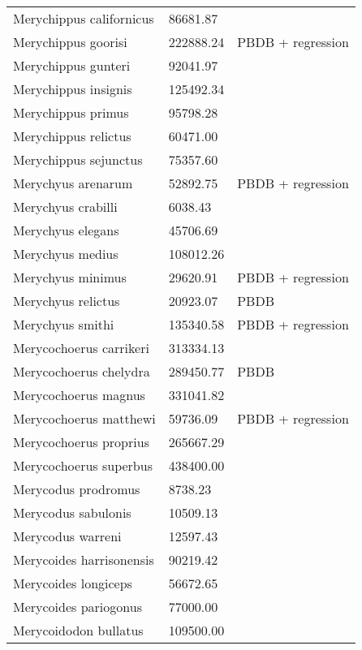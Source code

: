 \documentclass{article}
\begin{document}
\begin{center}
\begin{longtable}{p{} p{} p{} }
  Merychippus californicus & 86681.87 & \cite{Tomiya2013} \\ 
  Merychippus goorisi & 222888.24 & PBDB + regression \\ 
  Merychippus gunteri & 92041.97 & \cite{Tomiya2013} \\ 
  Merychippus insignis & 125492.34 & \cite{Tomiya2013} \\ 
  Merychippus primus & 95798.28 & \cite{Tomiya2013} \\ 
  Merychippus relictus & 60471.00 & \cite{McKenna2011} \\ 
  Merychippus sejunctus & 75357.60 & \cite{Tomiya2013} \\ 
  Merychyus arenarum & 52892.75 & PBDB + regression \\ 
  Merychyus crabilli & 6038.43 & \cite{Johanson1996} \\ 
  Merychyus elegans & 45706.69 & \cite{Tomiya2013} \\ 
  Merychyus medius & 108012.26 & \cite{Tomiya2013} \\ 
  Merychyus minimus & 29620.91 & PBDB + regression \\ 
  Merychyus relictus & 20923.07 & PBDB \\ 
  Merychyus smithi & 135340.58 & PBDB + regression \\ 
  Merycochoerus carrikeri & 313334.13 & \cite{Rose2011a} \\ 
  Merycochoerus chelydra & 289450.77 & PBDB \\ 
  Merycochoerus magnus & 331041.82 & \cite{Tomiya2013} \\ 
  Merycochoerus matthewi & 59736.09 & PBDB + regression \\ 
  Merycochoerus proprius & 265667.29 & \cite{Tomiya2013} \\ 
  Merycochoerus superbus & 438400.00 & \cite{McKenna2011} \\ 
  Merycodus prodromus & 8738.23 & \cite{Kelley1954} \\ 
  Merycodus sabulonis & 10509.13 & \cite{Tomiya2013} \\ 
  Merycodus warreni & 12597.43 & \cite{Baskin2004} \\ 
  Merycoides harrisonensis & 90219.42 & \cite{Tomiya2013} \\ 
  Merycoides longiceps & 56672.65 & \cite{Stock1948} \\ 
  Merycoides pariogonus & 77000.00 & \cite{McKenna2011} \\ 
  Merycoidodon bullatus & 109500.00 & \cite{McKenna2011} \\ 

\end{longtable}
\end{center}
\end{document}

